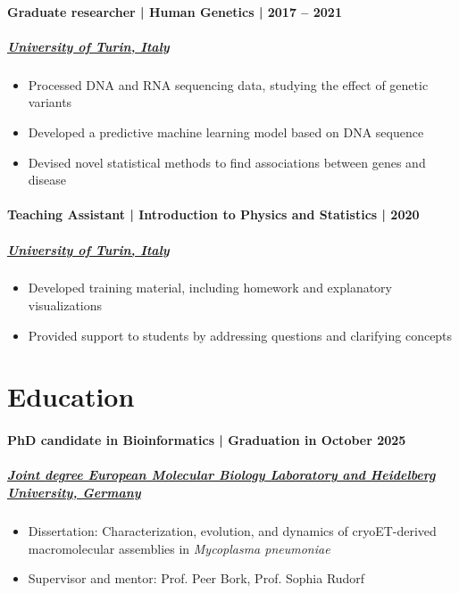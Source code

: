 \documentclass[
	DIV=23,
]{scrartcl}
\begin{document}
\paragraph{Graduate researcher | Human Genetics | 2017 -- 2021}
\subparagraph{\href{https://unito.it}{University of Turin, Italy}}
\begin{itemize}
	\item Processed DNA and RNA sequencing data, studying the effect of genetic variants
	\item Developed a predictive machine learning model based on DNA sequence
	\item Devised novel statistical methods to find associations between genes and disease
\end{itemize}

\paragraph{Teaching Assistant | Introduction to Physics and Statistics | 2020}
\subparagraph{\href{https://unito.it}{University of Turin, Italy}}
\begin{itemize}
	\item Developed training material, including homework and explanatory visualizations
	\item Provided support to students by addressing questions and clarifying concepts
\end{itemize}

\section*{Education}

\paragraph{PhD candidate in Bioinformatics | Graduation in October 2025}
\subparagraph{\href{https://embl.org}{Joint degree European Molecular Biology Laboratory and Heidelberg University, Germany}}
\begin{itemize}
	\item Dissertation: Characterization, evolution, and dynamics of cryoET-derived macromolecular assemblies in \textit{Mycoplasma pneumoniae}
	\item Supervisor and mentor: Prof. Peer Bork, Prof. Sophia Rudorf
\end{itemize}
\end{document}
